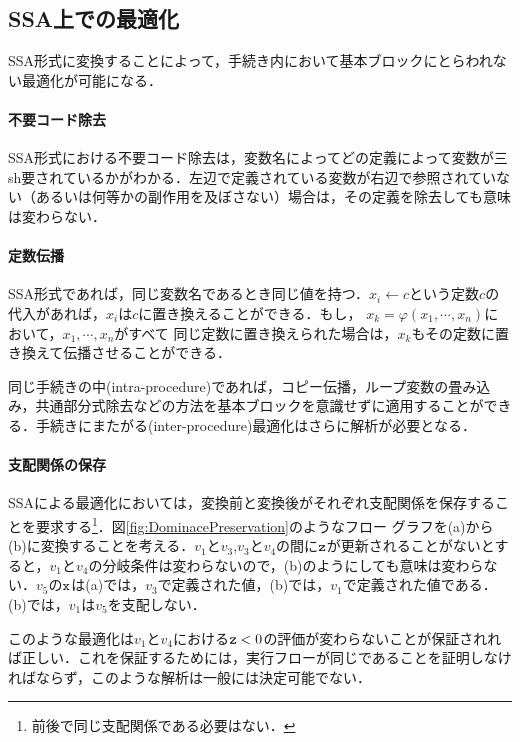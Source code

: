\documentclass[dvipdfmx,a4j]{jbook}
\begin{document}
\subsection{SSA上での最適化}

SSA形式に変換することによって，手続き内において基本ブロックにとらわれない最適化が可能になる．

\paragraph{不要コード除去}

SSA形式における不要コード除去は，変数名によってどの定義によって変数が三sh要されているかがわかる．左辺で定義されている変数が右辺で参照されていない（あるいは何等かの副作用を及ぼさない）場合は，その定義を除去しても意味は変わらない．

\paragraph{定数伝播}

SSA形式であれば，同じ変数名であるとき同じ値を持つ．$x_i\leftarrow c$という定数$c$の代入があれば，$x_i$は$c$に置き換えることができる．もし，
$x_k=\varphi(x_1,\cdots,x_n)$において，$x_1,\cdots,x_n$がすべて
同じ定数に置き換えられた場合は，$x_k$もその定数に置き換えて伝播させることができる．

同じ手続きの中(intra-procedure)であれば，コピー伝播，ループ変数の畳み込み，共通部分式除去などの方法を基本ブロックを意識せずに適用することができる．手続きにまたがる(inter-procedure)最適化はさらに解析が必要となる．

\paragraph{支配関係の保存}

SSAによる最適化においては，変換前と変換後がそれぞれ支配関係を保存することを要求する\footnote{前後で同じ支配関係である必要はない．}\cite{TigerBook}．図\ref{fig:DominacePreservation}のようなフロー
グラフを(a)から(b)に変換することを考える．$v_1$と$v_3$,$v_3$と$v_4$の間に$\texttt{z}$が更新されることがないとすると，$v_1$と$v_4$の分岐条件は変わらないので，(b)のようにしても意味は変わらない．$v_5$の$\texttt{x}$は(a)では，$v_3$で定義された値，(b)では，$v_1$で定義された値である．(b)では，$v_1$は$v_5$を支配しない．

このような最適化は$v_1$と$v_4$における$\texttt{z}<0$の評価が変わらないことが保証されれば正しい．これを保証するためには，実行フローが同じであることを証明しなければならず，このような解析は一般には決定可能でない．
\end{document}
